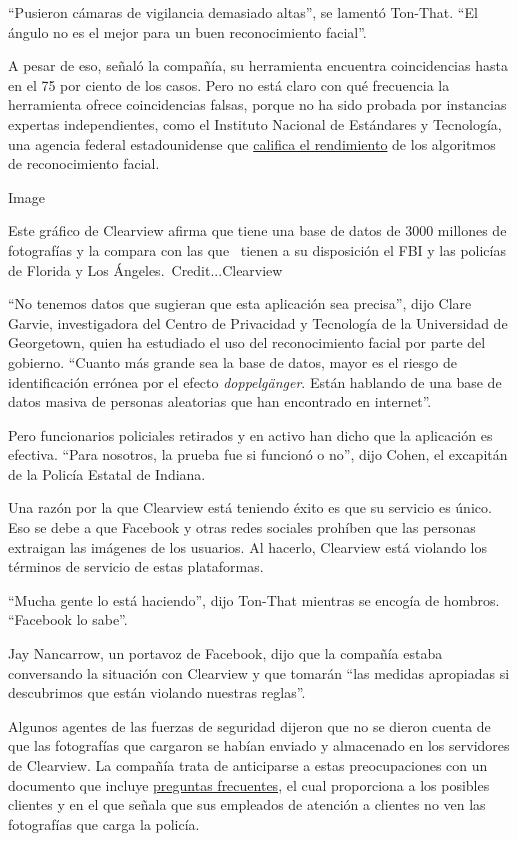 ``Pusieron cámaras de vigilancia demasiado altas'', se lamentó Ton-That.
``El ángulo no es el mejor para un buen reconocimiento facial''.

A pesar de eso, señaló la compañía, su herramienta encuentra
coincidencias hasta en el 75 por ciento de los casos. Pero no está claro
con qué frecuencia la herramienta ofrece coincidencias falsas, porque no
ha sido probada por instancias expertas independientes, como el
Instituto Nacional de Estándares y Tecnología, una agencia federal
estadounidense que
\href{https://www.nist.gov/programs-projects/face-recognition-vendor-test-frvt-ongoing}{califica
el rendimiento} de los algoritmos de reconocimiento facial.

Image

Este gráfico de Clearview afirma que tiene una base de datos de 3000
millones de fotografías y la compara con las que~ tienen a su
disposición el FBI y las policías de Florida y Los
Ángeles.~Credit...Clearview

``No tenemos datos que sugieran que esta aplicación sea precisa'', dijo
Clare Garvie, investigadora del Centro de Privacidad y Tecnología de la
Universidad de Georgetown, quien ha estudiado el uso del reconocimiento
facial por parte del gobierno. ``Cuanto más grande sea la base de datos,
mayor es el riesgo de identificación errónea por el efecto
\emph{doppelgänger}. Están hablando de una base de datos masiva de
personas aleatorias que han encontrado en internet''.

Pero funcionarios policiales retirados y en activo han dicho que la
aplicación es efectiva. ``Para nosotros, la prueba fue si funcionó o
no'', dijo Cohen, el excapitán de la Policía Estatal de Indiana.

Una razón por la que Clearview está teniendo éxito es que su servicio es
único. Eso se debe a que Facebook y otras redes sociales prohíben que
las personas extraigan las imágenes de los usuarios. Al hacerlo,
Clearview está violando los términos de servicio de estas plataformas.

``Mucha gente lo está haciendo'', dijo Ton-That mientras se encogía de
hombros. ``Facebook lo sabe''.

Jay Nancarrow, un portavoz de Facebook, dijo que la compañía estaba
conversando la situación con Clearview y que tomarán ``las medidas
apropiadas si descubrimos que están violando nuestras reglas''.

Algunos agentes de las fuerzas de seguridad dijeron que no se dieron
cuenta de que las fotografías que cargaron se habían enviado y
almacenado en los servidores de Clearview. La compañía trata de
anticiparse a estas preocupaciones con un documento que incluye
\href{https://int.nyt.com/data/documenthelper/6690-clearview-faq/c8b081a0bcca12e7903a/optimized/full.pdf\#page=1}{preguntas
frecuentes}, el cual proporciona a los posibles clientes y en el que
señala que sus empleados de atención a clientes no ven las fotografías
que carga la policía.

